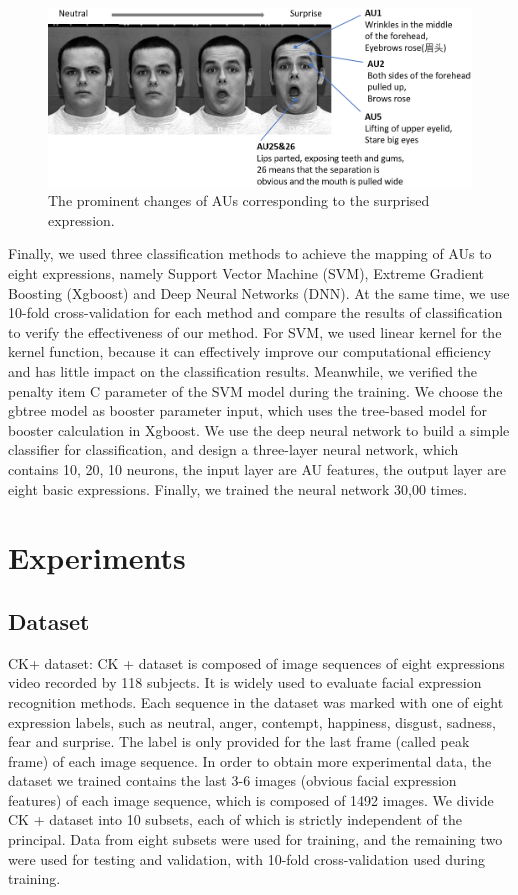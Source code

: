 \documentclass[10pt, conference, compsocconf]{IEEEtran}
\begin{document}
\begin{figure}[h]
	\centering
	\includegraphics[width=\linewidth]{AUexpression/surprise}
	\caption{The prominent changes of AUs corresponding to the surprised expression.}
\end{figure}

Finally, we used three classification methods to achieve the mapping of AUs to eight expressions, namely Support Vector Machine (SVM), Extreme Gradient Boosting (Xgboost) and Deep Neural Networks (DNN). At the same time, we use 10-fold cross-validation for each method and compare the results of classification to verify the effectiveness of our method. For SVM, we used linear kernel for the kernel function, because it can effectively improve our computational efficiency and has little impact on the classification results. Meanwhile, we verified the penalty item C parameter of the SVM model during the training. We choose the gbtree model as booster parameter input, which uses the tree-based model for booster calculation in Xgboost. We use the deep neural network to build a simple classifier for classification, and design a three-layer neural network, which contains 10, 20, 10 neurons, the input layer are AU features, the output layer are eight basic expressions. Finally, we trained the neural network 30,00 times.

\section{Experiments}

\subsection{Dataset}

CK+ dataset: CK + dataset\cite{Lucey2010The} is composed of image sequences of eight expressions video recorded by 118 subjects. It is widely used to evaluate facial expression recognition methods. Each sequence in the dataset was marked with one of eight expression labels, such as neutral, anger, contempt, happiness, disgust, sadness, fear and surprise. The label is only provided for the last frame (called peak frame) of each image sequence. In order to obtain more experimental data, the dataset we trained contains the last 3-6 images (obvious facial expression features) of each image sequence, which is composed of 1492 images. We divide CK + dataset into 10 subsets, each of which is strictly independent of the principal. Data from eight subsets were used for training, and the remaining two were used for testing and validation, with 10-fold cross-validation used during training.
\end{document}
